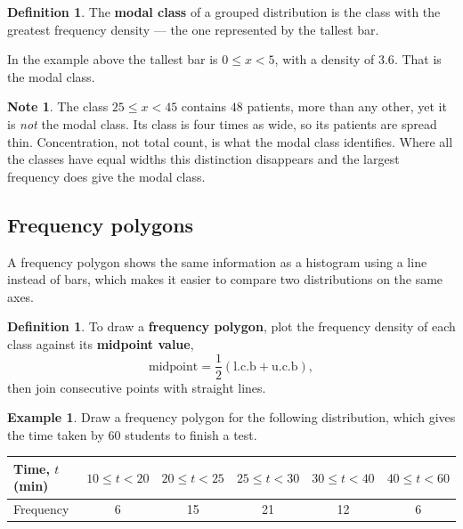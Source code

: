 \documentclass[11pt,a4paper]{article}
\theoremstyle{definition}
\newtheorem{definition}[thm]{Definition}
\newtheorem{example}[thm]{Example}
\newtheorem{note}[thm]{Note}
\begin{document}
\begin{definition}
The \textbf{modal class} of a grouped distribution is the class with the greatest
frequency density --- the one represented by the tallest bar.
\end{definition}

In the example above the tallest bar is $0\leq x<5$, with a density of $3.6$. That is
the modal class.

\begin{note}
The class $25\leq x<45$ contains $48$ patients, more than any other, yet it is
\emph{not} the modal class. Its class is four times as wide, so its patients are spread
thin. Concentration, not total count, is what the modal class identifies. Where all the
classes have equal widths this distinction disappears and the largest frequency does
give the modal class.
\end{note}

\subsection{Frequency polygons}

A frequency polygon shows the same information as a histogram using a line instead of
bars, which makes it easier to compare two distributions on the same axes.

\begin{definition}
To draw a \textbf{frequency polygon}, plot the frequency density of each class against
its \textbf{midpoint value},
$$\text{midpoint}=\frac{1}{2}\left(\text{l.c.b}+\text{u.c.b}\right),$$
then join consecutive points with straight lines.
\end{definition}

\begin{example}
Draw a frequency polygon for the following distribution, which gives the time taken by
$60$ students to finish a test.

\begin{table}[H]
\centering
\begin{tabular}{|l|c|c|c|c|c|}
\hline
Time, $t$ (min) & $10\leq t<20$ & $20\leq t<25$ & $25\leq t<30$ & $30\leq t<40$ &
$40\leq t<60$\\
\hline
Frequency & 6 & 15 & 21 & 12 & 6\\
\hline
\end{tabular}
\end{table}
\end{example}
\end{document}
